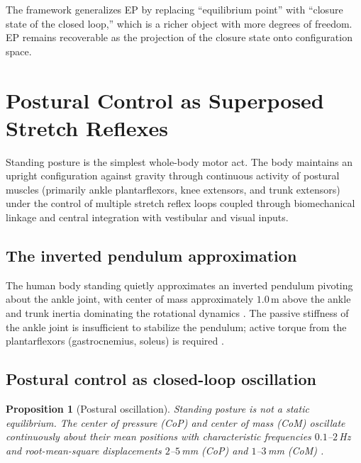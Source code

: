 \documentclass[11pt,twocolumn,a4paper]{article}
\newtheorem{proposition}[theorem]{Proposition}
\theoremstyle{definition}
\theoremstyle{remark}
\begin{document}
The framework generalizes EP by replacing ``equilibrium point'' with
``closure state of the closed loop,'' which is a richer object with
more degrees of freedom. EP remains recoverable as the projection of
the closure state onto configuration space.


\section{Postural Control as Superposed Stretch Reflexes}
\label{sec:postural}

Standing posture is the simplest whole-body motor act. The body
maintains an upright configuration against gravity through continuous
activity of postural muscles (primarily ankle plantarflexors,
knee extensors, and trunk extensors) under the control of multiple
stretch reflex loops coupled through biomechanical linkage and central
integration with vestibular and visual inputs.

\subsection{The inverted pendulum approximation}

The human body standing quietly approximates an inverted pendulum
pivoting about the ankle joint, with center of mass approximately
$1.0$\,m above the ankle and trunk inertia dominating the rotational
dynamics \citep{winter1995,horak2006}. The passive stiffness of the
ankle joint is insufficient to stabilize the pendulum; active torque
from the plantarflexors (gastrocnemius, soleus) is required
\citep{loram2002,morasso2002}.

\subsection{Postural control as closed-loop oscillation}

\begin{proposition}[Postural oscillation]
Standing posture is not a static equilibrium. The center of pressure
(CoP) and center of mass (CoM) oscillate continuously about their
mean positions with characteristic frequencies $0.1$--$2$\,Hz and
root-mean-square displacements $2$--$5$\,mm (CoP) and $1$--$3$\,mm
(CoM) \citep{zatsiorsky2000,winter1998}.
\end{proposition}
\end{document}

